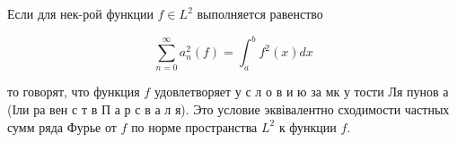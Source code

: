 \documentclass[10pt]{article}
\begin{document}
Если для нек-рой функции $f \in L^{2}$ выполняется равенство



\[

\sum_{n=0}^{\infty} a_{n}^{2}(f)=\int_{a}^{b} f^{2}(x) d x

\]



то говорят, что функция $f$ удовлетворяет у с л о в и ю за мк у тости Ля пунов а (Іли ра вен с т в П а р с в а л я). Это условие эквівалентно сходимости частных сумм ряда Фурье от $f$ по норме пространства $L^{2}$ к функции $f$.
\end{document}
